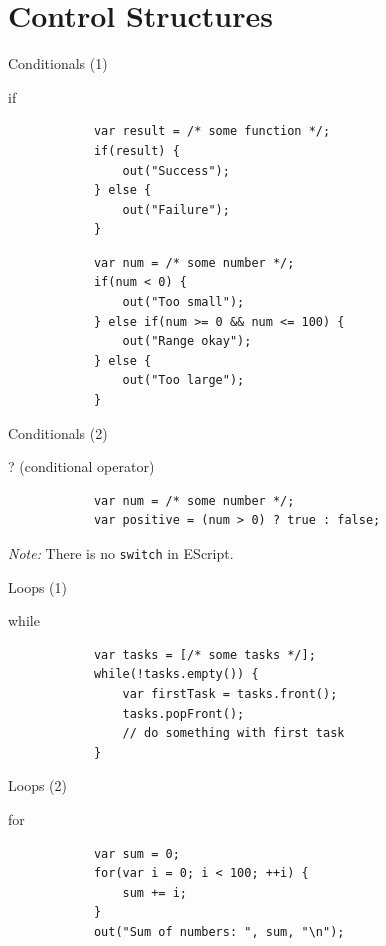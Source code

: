 \documentclass[ucs,9pt]{beamer}
\begin{document}
\section{Control Structures}
\begin{frame}[fragile]{Conditionals (1)}
	\begin{block}{if}
		\begin{lstlisting}
			var result = /* some function */;
			if(result) {
			    out("Success");
			} else {
			    out("Failure");
			}
		\end{lstlisting}
		\begin{lstlisting}
			var num = /* some number */;
			if(num < 0) {
			    out("Too small");
			} else if(num >= 0 && num <= 100) {
			    out("Range okay");
			} else {
			    out("Too large");
			}
		\end{lstlisting}
	\end{block}
\end{frame}

\begin{frame}[fragile]{Conditionals (2)}
	\begin{block}{? (conditional operator)}
		\begin{lstlisting}
			var num = /* some number */;
			var positive = (num > 0) ? true : false;
		\end{lstlisting}
	\end{block}
	\pause
	\vfill
	\emph{Note:} There is no \lstinline!switch! in EScript.
\end{frame}

\begin{frame}[fragile]{Loops (1)}
	\begin{block}{while}
		\begin{lstlisting}
			var tasks = [/* some tasks */];
			while(!tasks.empty()) {
			    var firstTask = tasks.front();
			    tasks.popFront();
			    // do something with first task
			}
		\end{lstlisting}
	\end{block}
\end{frame}

\begin{frame}[fragile]{Loops (2)}
	\begin{block}{for}
		\begin{lstlisting}
			var sum = 0;
			for(var i = 0; i < 100; ++i) {
			    sum += i;
			}
			out("Sum of numbers: ", sum, "\n");
		\end{lstlisting}
	\end{block}
\end{frame}
\end{document}

